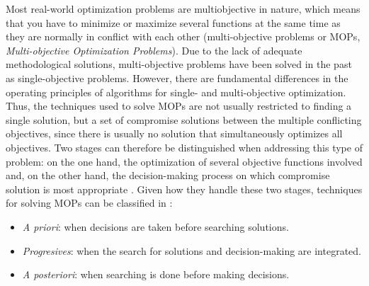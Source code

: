 Most real-world optimization problems are multiobjective in nature, which means that you have to minimize or maximize several functions at the same time as they are normally in conflict with each other (multi-objective problems or MOPs, \emph{Multi-objective Optimization Problems}). Due to the lack of adequate methodological solutions, multi-objective problems have been solved in the past as single-objective problems. However, there are fundamental differences in the operating principles of algorithms for single- and multi-objective optimization. Thus, the techniques used to solve MOPs are not usually restricted to finding a single solution, but a set of compromise solutions between the multiple conflicting objectives, since there is usually no solution that simultaneously optimizes all objectives. Two stages can therefore be distinguished when addressing this type of problem: on the one hand, the optimization of several objective functions involved and, on the other hand, the decision-making process on which compromise solution is most appropriate \cite{coello07evolutionary}. Given how they handle these two stages, techniques for solving MOPs can be classified in \cite{cohon75review}:

\begin{itemize}
	\item \emph{A priori}: when decisions are taken before searching solutions.
	\item \emph{Progresives}: when the search for solutions and decision-making are integrated.
	\item \emph{A posteriori}: when searching is done before making decisions.
\end{itemize}

